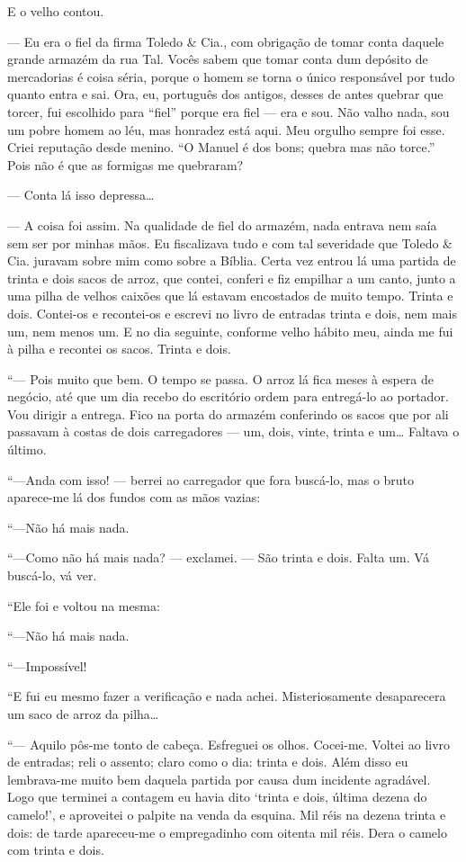 E o velho contou.

--- Eu era o fiel da firma Toledo \& Cia., com obrigação de tomar conta
daquele grande armazém da rua Tal. Vocês sabem que tomar conta dum
depósito de mercadorias é coisa séria, porque o homem se torna o único
responsável por tudo quanto entra e sai. Ora, eu, português dos antigos,
desses de antes quebrar que torcer, fui escolhido para ``fiel'' porque
era fiel --- era e sou. Não valho nada, sou um pobre homem ao léu, mas
honradez está aqui. Meu orgulho sempre foi esse. Criei reputação desde
menino. ``O Manuel é dos bons; quebra mas não torce.'' Pois não é que as
formigas me quebraram?

--- Conta lá isso depressa\ldots{}

--- A coisa foi assim. Na qualidade de fiel do armazém, nada entrava nem
saía sem ser por minhas mãos. Eu fiscalizava tudo e com tal severidade
que Toledo \& Cia. juravam sobre mim como sobre a Bíblia. Certa vez
entrou lá uma partida de trinta e dois sacos de arroz, que contei,
conferi e fiz empilhar a um canto, junto a uma pilha de velhos caixões
que lá estavam encostados de muito tempo. Trinta e dois. Contei-os e
recontei-os e escrevi no livro de entradas trinta e dois, nem mais um,
nem menos um. E no dia seguinte, conforme velho hábito meu, ainda me fui
à pilha e recontei os sacos. Trinta e dois.

``--- Pois muito que bem. O tempo se passa. O arroz lá fica meses à
espera de negócio, até que um dia recebo do escritório ordem para
entregá-lo ao portador. Vou dirigir a entrega. Fico na porta do armazém
conferindo os sacos que por ali passavam à costas de dois carregadores
--- um, dois, vinte, trinta e um\ldots{} Faltava o último.

``---Anda com isso! --- berrei ao carregador que fora buscá-lo, mas o
bruto aparece-me lá dos fundos com as mãos vazias:

``---Não há mais nada.

``---Como não há mais nada? --- exclamei. --- São trinta e dois. Falta
um. Vá buscá-lo, vá ver.

``Ele foi e voltou na mesma:

``---Não há mais nada.

``---Impossível!

``E fui eu mesmo fazer a verificação e nada achei. Misteriosamente
desaparecera um saco de arroz da pilha\ldots{}

``--- Aquilo pôs-me tonto de cabeça. Esfreguei os olhos. Cocei-me.
Voltei ao livro de entradas; reli o assento; claro como o dia: trinta e
dois. Além disso eu lembrava-me muito bem daquela partida por causa dum
incidente agradável. Logo que terminei a contagem eu havia dito `trinta
e dois, última dezena do camelo!', e aproveitei o palpite na venda da
esquina. Mil réis na dezena trinta e dois: de tarde apareceu-me o
empregadinho com oitenta mil réis. Dera o camelo com trinta e dois.

